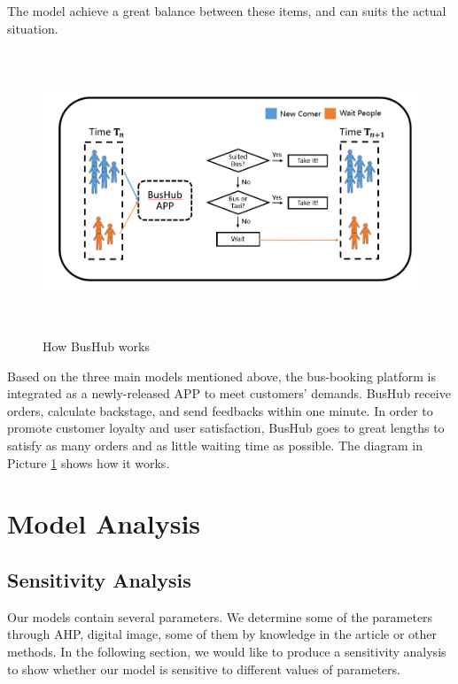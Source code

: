 \documentclass{mcmthesis}
\begin{document}
The model achieve a great balance between these items, and can suits the actual situation.

\begin{figure}[htbp]
    \centering
    \includegraphics[height=8.5cm,width=16cm]{figures/APP.png}
    \caption{How BusHub works}
    \label{fig:BusHub}
\end{figure}

Based on the three main models mentioned above, the bus-booking platform is integrated as a newly-released APP  to meet customers' demands. BusHub receive orders, calculate backstage, and send feedbacks within one minute. In order to promote customer loyalty and user satisfaction, BusHub goes to great lengths to satisfy as many orders and as little waiting time as possible. The diagram in Picture \ref{fig:BusHub} shows how it works.


\section{Model Analysis}\label{sec:mode}

\subsection{Sensitivity Analysis}
Our models contain several parameters. We determine some of the parameters through AHP, digital image, some of them by knowledge in the article or other methods. In the following section, we would like to produce a sensitivity analysis to show whether our model is sensitive to different values of parameters.
\end{document}
